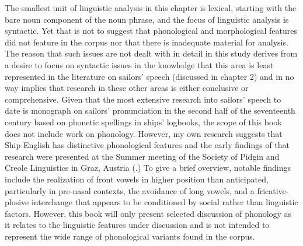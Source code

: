    The smallest unit of linguistic analysis in this chapter is lexical, starting with the bare noun component of the noun phrase, and the focus of linguistic analysis is syntactic. Yet that is not to suggest that phonological and morphological features did not feature in the corpus nor that there is inadequate material for analysis. The reason that such issues are not dealt with in detail in this study derives from a desire to focus on syntactic issues in the knowledge that this area is least represented in the literature on sailors’ speech (discussed in chapter 2) and in no way implies that research in these other areas is either conclusive or comprehensive. Given that the most extensive research into sailors’ speech to date is  monograph on sailors’ pronunciation in the second half of the seventeenth century based on phonetic spellings in ships’ logbooks, the scope of this book does not include work on phonology. However, my own research suggests that Ship English has distinctive phonological features and the early findings of that research were presented at the Summer meeting of the Society of Pidgin and Creole Linguistics in Graz, Austria (\citealt{Delgado2015}.) To give a brief overview, notable findings include the realization of front vowels in higher position than anticipated, particularly in pre-nasal contexts, the avoidance of long vowels, and a fricative-plosive interchange that appears to be conditioned by social rather than linguistic factors. However, this book will only present selected discussion of phonology as it relates to the linguistic features under discussion and is not intended to represent the wide range of phonological variants found in the corpus. 

